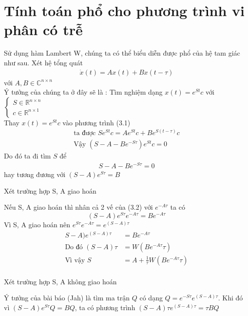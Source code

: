  \chapter{Tính toán phổ cho phương trình vi phân có trễ}
 Sử dụng hàm Lambert W, chúng ta có thể biểu diễn được phổ của hệ tam giác như sau.
 Xét hệ tổng quát 
 \begin{align} 
 \dot{x}(t) = Ax(t) + Bx(t-\tau)
 \end{align}
 với $A, B \in \mathbb{C}^{n \times n }$\\
 Ý tưởng của chúng ta ở đây sẽ là : Tìm nghiệm dạng $x(t) = e^{St}c$ với $\left\{\begin{matrix}
S \in \mathbb{R}^{n \times n}
\\ 
c \in \mathbb{R}^{n \times 1}
\end{matrix}\right.$ \\
 Thay $x(t) = e^{St}c$ vào phương trình (3.1)
 \begin{align*}
 \mbox{ta được } Se^{St}c = Ae^{St}c + Be^{S(t - \tau)}c \\
 \mbox{Vậy } (S - A - Be^{-S\tau})e^{St}c = 0 
 \end{align*}
 Do đó ta đi tìm $S$ để \begin{align}
 S - A - Be^{-S\tau} = 0 \tag{*} 
 \end{align}
 hay tương đương với $(S - A)e^{S\tau} = B$
 
 \begin{op} 
 Xét trường hợp S, A giao hoán \\
 \end{op}
 Nếu S, A giao hoán thì nhân cả 2 vế của (3.2) với $e^{-A\tau}$ ta có 
 $$ (S - A)e^{S\tau}e^{-A\tau} = Be^{-A\tau} $$
 Vì S, A giao hoán nên $e^{S\tau}e^{-A\tau} = e^{(S-A)\tau}$
 \begin{align*}
  S-A)e^{(S-A)\tau} &= Be^{-A\tau} \\
  \mbox{Do đó } (S-A)\tau &= W(Be^{-A\tau}\tau) \\
  \mbox{Vì vậy } S &= A + \frac{1}{\tau}W(Be^{-A\tau}\tau) \\ 
  \end{align*}  
 
 \begin{op}  
 Xét trường hợp S, A không giao hoán\\
 \end{op}
 Ý tưởng của bài báo (Jah) là tìm ma trận $Q$ có dạng $Q = e^{-S\tau}e^{(S-A)\tau}$. Khi đó vì $(S-A)e^{S\tau}Q = BQ$, ta có phương trình $(S-A)\tau e^{(S-A)\tau} = \tau BQ$\\
 
